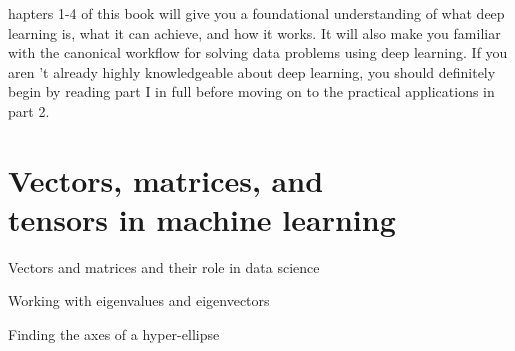 \documentclass[a4paper,twoside,openany]{book}
\begin{document}
	\begin{spacing}{1.3}
	hapters 1-4 of this book will give you a foundational 									understanding of what deep learning is, what it can achieve, and how it works. It will also make 		you familiar with the canonical workflow for solving data problems using deep learning. If you 
	aren 't already highly knowledgeable about deep learning, you should definitely begin by reading 		part I in full before moving on to the practical applications in part 2.
	\end{spacing} 
	
	\afterpage{
		\null \thispagestyle{empty} \newpage	
	}
	
	\chapter[Vectors, matrices, and tensors in machine learning]{Vectors, matrices, and \\ tensors in 		machine learning}
	
	\pagestyle{ChapterMainStyle} %
	
	\begin{ChapterTopics}{0.7}
		\item Vectors and matrices and their role in data science
		\item Working with eigenvalues and eigenvectors
		\item Finding the axes of a hyper-ellipse
	\end{ChapterTopics} 
	
\end{document}
